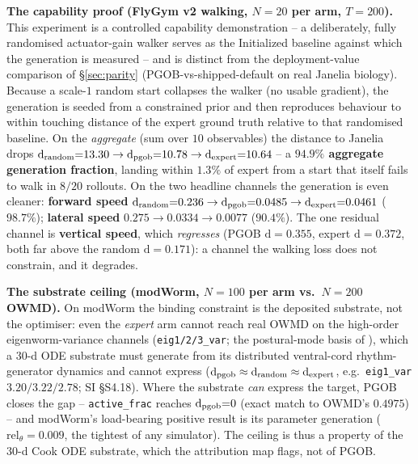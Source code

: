 \documentclass[11pt]{article}
\begin{document}
\textbf{The capability proof (FlyGym v2 walking, $N{=}20$ per arm, $T{=}200$).} This experiment is a controlled capability demonstration -- a deliberately, fully randomised actuator-gain walker serves as the Initialized baseline against which the generation is measured -- and is distinct from the deployment-value comparison of \S\ref{sec:parity} (PGOB-vs-shipped-default on real Janelia biology). Because a scale-$1$ random start collapses the walker (no usable gradient), the generation is seeded from a constrained prior and then reproduces behaviour to within touching distance of the expert ground truth relative to that randomised baseline. On the \emph{aggregate} (sum over $10$ observables) the distance to Janelia drops $\mathrm{d}_{\rm random}{=}13.30\to\mathrm{d}_{\rm pgob}{=}10.78\to\mathrm{d}_{\rm expert}{=}10.64$ -- a \textbf{$94.9\%$ aggregate generation fraction}, landing within $1.3\%$ of expert from a start that itself fails to walk in $8/20$ rollouts. On the two headline channels the generation is even cleaner: \textbf{forward speed} $\mathrm{d}_{\rm random}{=}0.236\to\mathrm{d}_{\rm pgob}{=}0.0485\to\mathrm{d}_{\rm expert}{=}0.0461$ (\textbf{$98.7\%$}); \textbf{lateral speed} $0.275\to0.0334\to0.0077$ (\textbf{$90.4\%$}). The one residual channel is \textbf{vertical speed}, which \emph{regresses} (PGOB $\mathrm{d}{=}0.355$, expert $\mathrm{d}{=}0.372$, both far above the random $\mathrm{d}{=}0.171$): a channel the walking loss does not constrain, and it degrades.

\textbf{The substrate ceiling (modWorm, $N{=}100$ per arm vs.\ $N{=}200$ OWMD).} On modWorm the binding constraint is the deposited substrate, not the optimiser: even the \emph{expert} arm cannot reach real OWMD on the high-order eigenworm-variance channels (\texttt{eig1/2/3\_var}; the postural-mode basis of \citealp{stephens2008dimensionality,stephens2011emergence}), which a $30$-d ODE substrate must generate from its distributed ventral-cord rhythm-generator dynamics \citep{wen2012proprioceptive,gao2018excitatory,fouad2018distributed,wen2018caenorhabditis} and cannot express ($\mathrm{d}_{\rm pgob}\approx\mathrm{d}_{\rm random}\approx\mathrm{d}_{\rm expert}$, e.g.\ \texttt{eig1\_var} $3.20/3.22/2.78$; SI \S S4.18). Where the substrate \emph{can} express the target, PGOB closes the gap -- \texttt{active\_frac} reaches $\mathrm{d}_{\rm pgob}{=}0$ (exact match to OWMD's $0.4975$) -- and modWorm's load-bearing positive result is its parameter generation ($\mathrm{rel}_\theta{=}0.009$, the tightest of any simulator). The ceiling is thus a property of the $30$-d Cook ODE substrate, which the attribution map flags, not of PGOB.
\end{document}
